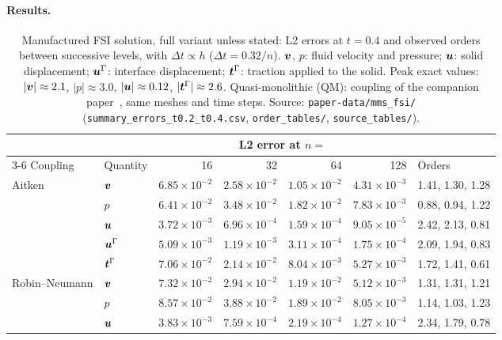 \paragraph{Results.}
\begin{table}[htbp]
	\centering
	\footnotesize
	\setlength{\tabcolsep}{4pt}
	\caption{Manufactured FSI solution, full variant unless stated: L2 errors at $t = 0.4$ and observed orders between successive levels, with $\Delta t \propto h$ ($\Delta t = 0.32/n$). $\boldsymbol{v}$, $p$: fluid velocity and pressure; $\boldsymbol{u}$: solid displacement; $\boldsymbol{u}^\Gamma$: interface displacement; $\boldsymbol{t}^\Gamma$: traction applied to the solid. Peak exact values: $|\boldsymbol{v}| \approx 2.1$, $|p| \approx 3.0$, $|\boldsymbol{u}| \approx 0.12$, $|\boldsymbol{t}^\Gamma| \approx 2.6$. Quasi-monolithic (QM): coupling of the companion paper~\citep{CardiffBatistic2026QM}, same meshes and time steps. Source: \texttt{paper-data/mms\_fsi/} (\texttt{summary\_errors\_t0.2\_t0.4.csv}, \texttt{order\_tables/}, \texttt{source\_tables/}).}
	\label{tab:mms_fsi}
	\begin{tabular}{llrrrrl}
		\toprule
		 & & \multicolumn{4}{c}{L2 error at $n =$} & \\
		\cmidrule(lr){3-6}
		Coupling & Quantity & 16 & 32 & 64 & 128 & Orders \\
		\midrule
		Aitken & $\boldsymbol{v}$ & $6.85\times10^{-2}$ & $2.58\times10^{-2}$ & $1.05\times10^{-2}$ & $4.31\times10^{-3}$ & 1.41, 1.30, 1.28 \\
		 & $p$ & $6.41\times10^{-2}$ & $3.48\times10^{-2}$ & $1.82\times10^{-2}$ & $7.83\times10^{-3}$ & 0.88, 0.94, 1.22 \\
		 & $\boldsymbol{u}$ & $3.72\times10^{-3}$ & $6.96\times10^{-4}$ & $1.59\times10^{-4}$ & $9.05\times10^{-5}$ & 2.42, 2.13, 0.81 \\
		 & $\boldsymbol{u}^\Gamma$ & $5.09\times10^{-3}$ & $1.19\times10^{-3}$ & $3.11\times10^{-4}$ & $1.75\times10^{-4}$ & 2.09, 1.94, 0.83 \\
		 & $\boldsymbol{t}^\Gamma$ & $7.06\times10^{-2}$ & $2.14\times10^{-2}$ & $8.04\times10^{-3}$ & $5.27\times10^{-3}$ & 1.72, 1.41, 0.61 \\
		\midrule
		Robin--Neumann & $\boldsymbol{v}$ & $7.32\times10^{-2}$ & $2.94\times10^{-2}$ & $1.19\times10^{-2}$ & $5.12\times10^{-3}$ & 1.31, 1.31, 1.21 \\
		 & $p$ & $8.57\times10^{-2}$ & $3.88\times10^{-2}$ & $1.89\times10^{-2}$ & $8.05\times10^{-3}$ & 1.14, 1.03, 1.23 \\
		 & $\boldsymbol{u}$ & $3.83\times10^{-3}$ & $7.59\times10^{-4}$ & $2.19\times10^{-4}$ & $1.27\times10^{-4}$ & 2.34, 1.79, 0.78 \\

\end{tabular}
\end{table}
